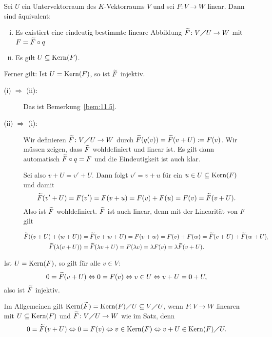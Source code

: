 \begin{satz}[Homomorphiesatz]
	\label{satz:11.6}
	Sei $U$ ein Untervektorraum des $K$-Vektorraums $V$ und sei $F \colon V \rightarrow W$ linear.
	Dann sind äquivalent: 
	\begin{enumerate}[(i)]
		\item Es existiert eine eindeutig bestimmte lineare Abbildung $\widetilde{F} \colon V \diagup U \rightarrow W$ mit $F = \widetilde{F} \circ q$
		\item Es gilt $U \subseteq \operatorname{Kern}(F)$.
	\end{enumerate}
	Ferner gilt:
	Ist $U = \operatorname{Kern}(F)$, so ist $\widetilde{F}$ injektiv.
\end{satz}

\begin{beweis}
	\begin{description}
		\item[(i) $\Rightarrow$ (ii):] Das ist Bemerkung~\ref{bem:11.5}.
		\item[(ii) $\Rightarrow$ (i):] Wir definieren $\widetilde{F}\colon V \diagup U \rightarrow W$ durch $\widetilde{F}(q(v)) = \widetilde{F}(v+U) := F(v)$.
		Wir müssen zeigen, dass $\widetilde{F}$ wohldefiniert und linear ist.
		Es gilt dann automatisch $\widetilde{F} \circ q = F$ und die Eindeutigkeit ist auch klar.
		
		Sei also $v + U = v' + U$.
		Dann folgt $v' = v+u$ für ein $u \in U \subseteq \operatorname{Kern}(F)$ und damit
		\[
			\widetilde{F}(v'+U) = F(v') = F(v+u) = F(v) + F(u) = F(v) = \widetilde{F}(v+U).
		\]
		Also ist $\widetilde{F}$ wohldefiniert.
		$\widetilde{F}$ ist auch linear, denn mit der Linearität von $F$ gilt
		 
		
		\begin{align*}
			\widetilde{F}((v+U)+(w+U)) &= \widetilde{F}(v+w+U) = F(v+w) = F(v) + F(w) = \widetilde{F}(v+U) + \widetilde{F}(w+U), \\
			\widetilde{F}(\lambda(v+U)) &= \widetilde{F}(\lambda v + U) = F(\lambda v) =\lambda F(v) = \lambda \widetilde{F}(v+U).		
		\end{align*}
	\end{description}
	Ist $U = \operatorname{Kern}(F)$, so gilt für alle $v \in V$:
	\[
		0 = \widetilde{F}(v+U) \Leftrightarrow 0 = F(v) \Leftrightarrow v \in U \Leftrightarrow v + U = 0 + U,
	\]
	also ist $\widetilde{F}$ injektiv. 
\end{beweis}

\begin{bemerkung}
	\label{bem:11.7}
	Im Allgemeinen gilt $\operatorname{Kern}(\widetilde{F}) = \operatorname{Kern}(F) \diagup U \subseteq V \diagup U$, wenn $F \colon V \rightarrow W$ linearen mit $U \subseteq \operatorname{Kern}(F)$ und $\widetilde{F}\colon V \diagup U \rightarrow W$ wie im Satz, denn
	\[
		0 = \widetilde{F}(v+U) \Leftrightarrow 0 = F(v) \Leftrightarrow v \in \operatorname{Kern}(F) \Leftrightarrow v + U \in \operatorname{Kern}(F) \diagup U.
	\]
\end{bemerkung}

